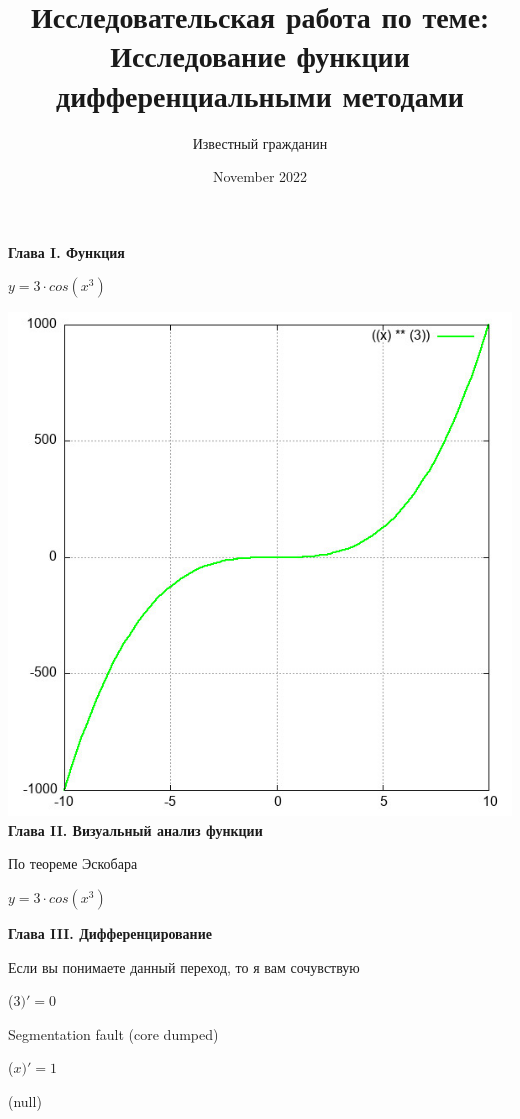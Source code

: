 \documentclass[12pt,a4paper,fleqn]{article}
\title{\textbf{\LARGE{Исследовательская работа по теме:\\Исследование функции дифференциальными методами}}}
\author{Известный гражданин}
\date{November 2022}
\begin{document}
\maketitle
\newpage\newpage \textbf{\LARGE{Глава I. Функция}}

\begin{center}
$y = $$3 \cdot cos(x^{3})$

\end{center}
\includegraphics{GraphicDumps/plot.jpg}\newpage \textbf{\LARGE{Глава II. Визуальный анализ функции}}

По теореме Эскобара

\begin{center}
$y = $$3 \cdot cos(x^{3})$

\end{center}
\newpage \textbf{\LARGE{Глава III. Дифференцирование}}

Если вы понимаете данный переход, то я вам сочувствую

\begin{center}
 ($3)'
  = 0$\end{center}
Segmentation fault (core dumped)

\begin{center}
 ($x)'
  = 1$\end{center}
(null)\cite{link4}
\end{document}
